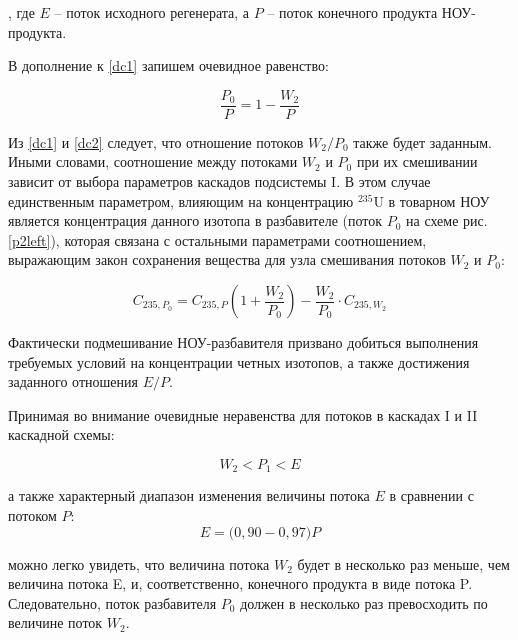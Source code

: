 , где $E$ -- поток исходного регенерата, а $P$ -- поток конечного продукта НОУ-продукта.

В дополнение к \ref{dc1} запишем очевидное равенство:

\begin{equation}
    \label{dc2}
    \frac{P_{0}}{P} = 1 - \frac{W_{2}}{P}
\end{equation}

Из \ref{dc1} и \ref{dc2} следует, что отношение потоков ${W_2}{/}{P_0}$ также будет заданным. Иными словами, соотношение между потоками $W_2$ и $P_0$ при их смешивании зависит от выбора параметров каскадов подсистемы I. В этом случае единственным параметром, влияющим на концентрацию $^{235}$U в товарном НОУ является концентрация данного изотопа в разбавителе (поток $P_0$ на схеме рис. \ref{p2left}), которая связана с остальными параметрами соотношением, выражающим закон сохранения вещества для узла смешивания потоков $W_2$ и $P_0$: 

\begin{equation}
    \label{dc3}
    C_{235,P_{0}}=C_{235,P}({1 + \frac{W_{2}}{P_{0}}}) - \frac{W_{2}}{P_{0}}\cdot C_{235,W_{2}}
\end{equation}


Фактически подмешивание НОУ-разбавителя призвано добиться выполнения требуемых условий на концентрации четных изотопов, а также достижения заданного отношения $E{/}P$.

Принимая во внимание очевидные неравенства для потоков в каскадах I и II каскадной схемы:

\begin{equation}
    \label{dc3a}
    W_{2} < P_{1} <  E
\end{equation}

а также характерный диапазон изменения величины потока $E$ в сравнении с потоком $P$:
\begin{equation}
    \label{dc3b}
    E = {(}0,90-0,97{)}P
\end{equation}

можно легко увидеть, что величина потока $W_{2}$ будет в несколько раз меньше, чем величина потока E, и, соответственно, конечного продукта в виде потока P. Следовательно, поток разбавителя $P_{0}$ должен в несколько раз превосходить по величине поток $W_{2}$. 

